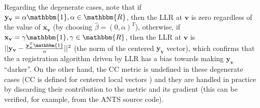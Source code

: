 Regarding the degenerate cases, note that if $\mathbf{y}_{\mathbf{v}} = \alpha \mathbbm{1}, \alpha\in \mathbbm{R}$, then the LLR at $\mathbf{v}$ is zero regardless of the value of $\mathbf{x}_{\mathbf{v}}$ (by choosing $\widehat{\beta} = (0, \alpha)^{T}$), otherwise, if $\mathbf{x}_{\mathbf{v}} = \gamma \mathbbm{1}, \gamma\in \mathbbm{R}$, then the LLR at $\mathbf{v}$ is $||\mathbf{y}_{\mathbf{v}} - \frac{\mathbf{y}_{\mathbf{v}}^{T}\mathbbm{1}}{n}||^{2}$ (the norm of the centered $\mathbf{y}_{\mathbf{v}}$ vector), which confirms that the a registration algorithm driven by LLR has a bias towards making $\mathbf{y}_{\mathbf{v}}$ ``darker''. On the other hand, the CC metric is undefined in these degenerate cases (CC is defined for centered local vectors \cite{Avants2008}\cite{Avants2011}) and they are handled in practice by discarding their contribution to the metric and its gradient (this can be verified, for example, from the ANTS \cite{Avants2011a} source code).

